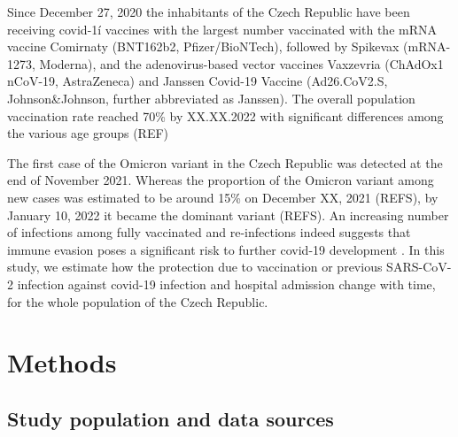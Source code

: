 \documentclass[preprint,12pt,authoryear]{elsarticle}
\begin{document}
Since December 27, 2020 the inhabitants of the Czech Republic have been receiving covid-1í vaccines with the largest number vaccinated with the mRNA vaccine Comirnaty (BNT162b2, Pfizer/BioNTech), followed by Spikevax (mRNA-1273, Moderna), and the adenovirus-based vector vaccines Vaxzevria (ChAdOx1 nCoV-19, AstraZeneca) and Janssen Covid-19 Vaccine (Ad26.CoV2.S, Johnson\&Johnson, further abbreviated as Janssen). The overall population vaccination rate reached 70\% by XX.XX.2022 with significant differences among the various age groups (REF) %

The first case of the Omicron variant in the Czech Republic was detected at the end of November 2021. Whereas the proportion of the Omicron variant among new cases was estimated to be around 15\% on December XX, 2021 (REFS), by January 10, 2022 it became the dominant variant (REFS). An increasing number of infections among fully vaccinated and re-infections indeed suggests that immune evasion poses a significant risk to further covid-19 development \citep{mzcr}. In this study, we estimate how the protection due to vaccination or previous SARS-CoV-2 infection against covid-19 infection and hospital admission change with time, for the whole population of the Czech Republic.

\section{Methods}
\label{sec2}

\subsection{Study population and data sources}
\end{document}
